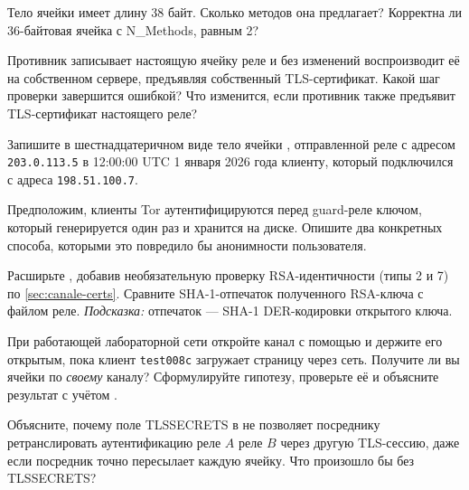 \begin{esercizio}[1]\label{es:07-authchallenge}
Тело ячейки  имеет длину 38 байт. Сколько методов она предлагает? Корректна ли 36-байтовая ячейка с N\_Methods, равным 2?
\end{esercizio}

\begin{esercizio}[2]\label{es:07-impostore}
Противник записывает настоящую ячейку  реле и без изменений воспроизводит её на собственном сервере, предъявляя собственный TLS-сертификат. Какой шаг проверки завершится ошибкой? Что изменится, если противник также предъявит TLS-сертификат настоящего реле?
\end{esercizio}

\begin{esercizio}[2]\label{es:07-netinfo}
Запишите в шестнадцатеричном виде тело ячейки , отправленной реле с адресом \texttt{203.0.113.5} в 12:00:00 UTC 1 января 2026 года клиенту, который подключился с адреса \texttt{198.51.100.7}.
\end{esercizio}

\begin{esercizio}[2]\label{es:07-client-auth}
Предположим, клиенты Tor аутентифицируются перед guard-реле ключом, который генерируется один раз и хранится на диске. Опишите два конкретных способа, которыми это повредило бы анонимности пользователя.
\end{esercizio}

\begin{esercizio}[2]\label{es:07-rsa}
Расширьте , добавив необязательную проверку RSA-идентичности (типы 2 и 7) по \cref{sec:canale-certs}. Сравните SHA-1-отпечаток полученного RSA-ключа с файлом  реле. \emph{Подсказка:} отпечаток --- SHA-1 DER-кодировки открытого ключа.
\end{esercizio}

\begin{esercizio}[3]\label{es:07-padding}
При работающей лабораторной сети откройте канал с помощью  и держите его открытым, пока клиент \texttt{test008c} загружает страницу через сеть. Получите ли вы ячейки  по \emph{своему} каналу? Сформулируйте гипотезу, проверьте её и объясните результат с учётом .
\end{esercizio}

\begin{esercizio}[3]\label{es:07-mitm}
Объясните, почему поле TLSSECRETS в  не позволяет посреднику ретранслировать аутентификацию реле $A$ реле $B$ через другую TLS-сессию, даже если посредник точно пересылает каждую ячейку. Что произошло бы без TLSSECRETS?
\end{esercizio}

